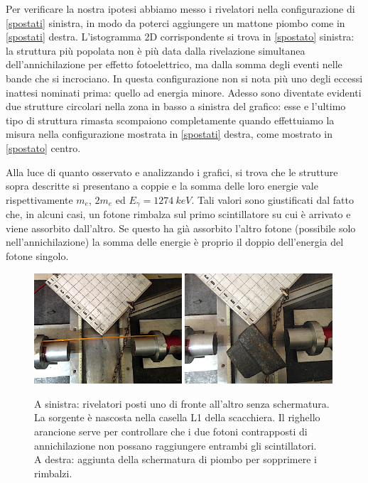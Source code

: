 Per verificare la nostra ipotesi abbiamo messo i rivelatori nella configurazione di \autoref{spostati} sinistra, in modo da poterci aggiungere un mattone piombo come in \autoref{spostati} destra.
L'istogramma 2D corrispondente si trova in \autoref{spostato} sinistra: la struttura più popolata non è più data dalla rivelazione simultanea dell'annichilazione per effetto fotoelettrico, ma dalla somma degli eventi nelle bande che si incrociano.
In questa configurazione non si nota più uno degli eccessi inattesi nominati prima: quello ad energia minore.
Adesso sono diventate evidenti due strutture circolari nella zona in basso a sinistra del grafico: esse e l'ultimo tipo di struttura rimasta scompaiono completamente quando effettuiamo la misura nella configurazione mostrata in \autoref{spostati} destra, come mostrato in \autoref{spostato} centro.

Alla luce di quanto osservato e analizzando i grafici, si trova che le strutture sopra descritte si presentano a coppie e la somma delle loro energie vale rispettivamente $m_e$, $2m_e$ ed $E_{\gamma}=\SI{1274}{keV}$.
Tali valori sono giustificati dal fatto che, in alcuni casi, un fotone rimbalza sul primo scintillatore su cui è arrivato e viene assorbito dall'altro. Se questo ha già assorbito l'altro fotone (possibile solo nell'annichilazione) la somma delle energie è proprio il doppio dell'energia del fotone singolo.

\begin{figure}[h]
\centering
\subfloat
{\includegraphics[width=0.49\textwidth]{immagini/alter}}
\hfill
\subfloat
{\includegraphics[width=0.49\textwidth]{immagini/spostati2}}
\caption{
A sinistra:
rivelatori posti uno di fronte all'altro senza schermatura.
La sorgente è nascosta nella casella L1 della scacchiera.
Il righello arancione serve per controllare che i due fotoni contrapposti di annichilazione
non possano raggiungere entrambi gli scintillatori.\\
A destra: aggiunta della schermatura di piombo per sopprimere i rimbalzi.}
\label{spostati}
\end{figure}

